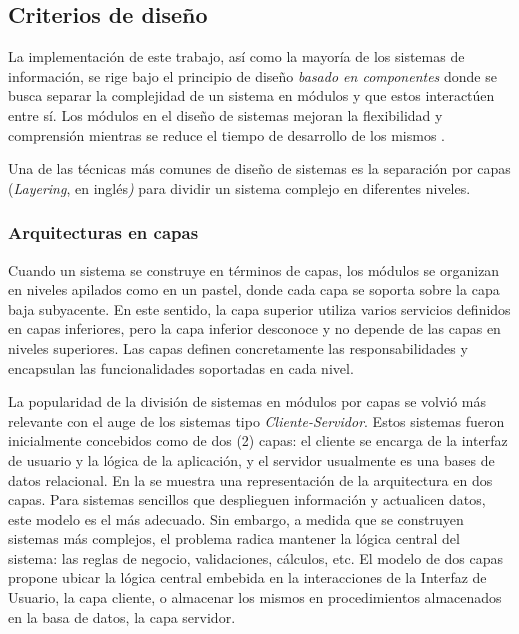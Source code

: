 \subsection{Criterios de diseño}

\label{ssec52:criterios-dise=0000F1o}La implementación de este trabajo,
así como la mayoría de los sistemas de información, se rige bajo el
principio de diseño \emph{basado en componentes} donde se busca separar
la complejidad de un sistema en módulos y que estos interactúen entre
sí. Los módulos en el diseño de sistemas mejoran la flexibilidad y
comprensión mientras se reduce el tiempo de desarrollo de los mismos
\cite{Parnas1972}.

Una de las técnicas más comunes de diseño de sistemas\emph{ }es la
separación por capas (\emph{Layering}, en inglés\emph{)} para dividir
un sistema complejo \cite{Fowler2002} en diferentes niveles. 

\subsubsection{Arquitecturas en capas}

Cuando un sistema se construye en términos de capas, los módulos se
organizan en niveles apilados como en un pastel, donde cada capa se
soporta sobre la capa baja subyacente. En este sentido, la capa superior
utiliza varios servicios definidos en capas inferiores, pero la capa
inferior desconoce y no depende de las capas en niveles superiores.
Las capas definen concretamente las responsabilidades y encapsulan
las funcionalidades soportadas en cada nivel.

La popularidad de la división de sistemas en módulos por capas se
volvió más relevante con el auge de los sistemas tipo \emph{Cliente-Servidor}.
Estos sistemas fueron inicialmente concebidos como de dos (2) capas:
el cliente se encarga de la interfaz de usuario y la lógica de la
aplicación, y el servidor usualmente es una bases de datos relacional.
En la  se muestra una representación
de la arquitectura en dos capas. Para sistemas sencillos que desplieguen
información y actualicen datos, este modelo es el más adecuado. Sin
embargo, a medida que se construyen sistemas más complejos, el problema
radica mantener la lógica central del sistema: las reglas de negocio,
validaciones, cálculos, etc. El modelo de dos capas propone ubicar
la lógica central embebida en la interacciones de la Interfaz de Usuario,
la capa cliente, o almacenar los mismos en procedimientos almacenados
en la basa de datos, la capa servidor.

